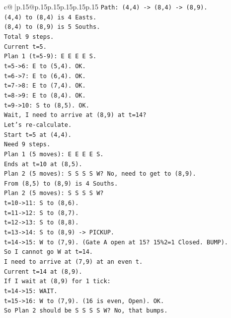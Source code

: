 \documentclass{article}
\begin{document}
{\begin{supertabular}{c@{$\;$}|p{.15\linewidth}@{}p{.15\linewidth}p{.15\linewidth}p{.15\linewidth}p{.15\linewidth}p{.15\linewidth}}
{{{\texttt{Path: (4,4) {-}> (8,4) {-}> (8,9).} \\
\texttt{(4,4) to (8,4) is 4 Easts.} \\
\texttt{(8,4) to (8,9) is 5 Souths.} \\
\texttt{Total 9 steps.} \\
\texttt{Current t=5.} \\
\texttt{Plan 1 (t=5{-}9): E E E E S.} \\
\texttt{t=5{-}>6: E to (5,4). OK.} \\
\texttt{t=6{-}>7: E to (6,4). OK.} \\
\texttt{t=7{-}>8: E to (7,4). OK.} \\
\texttt{t=8{-}>9: E to (8,4). OK.} \\
\texttt{t=9{-}>10: S to (8,5). OK.} \\
\texttt{Wait, I need to arrive at (8,9) at t=14?} \\
\texttt{Let's re{-}calculate.} \\
\texttt{Start t=5 at (4,4).} \\
\texttt{Need 9 steps.} \\
\texttt{Plan 1 (5 moves): E E E E S.} \\
\texttt{Ends at t=10 at (8,5).} \\
\texttt{Plan 2 (5 moves): S S S S W? No, need to get to (8,9).} \\
\texttt{From (8,5) to (8,9) is 4 Souths.} \\
\texttt{Plan 2 (5 moves): S S S S W?} \\
\texttt{t=10{-}>11: S to (8,6).} \\
\texttt{t=11{-}>12: S to (8,7).} \\
\texttt{t=12{-}>13: S to (8,8).} \\
\texttt{t=13{-}>14: S to (8,9) {-}> PICKUP.} \\
\texttt{t=14{-}>15: W to (7,9). (Gate A open at 15? 15\%2=1 Closed. BUMP).} \\
\texttt{So I cannot go W at t=14.} \\
\texttt{I need to arrive at (7,9) at an even t.} \\
\texttt{Current t=14 at (8,9).} \\
\texttt{If I wait at (8,9) for 1 tick:} \\
\texttt{t=14{-}>15: WAIT.} \\
\texttt{t=15{-}>16: W to (7,9). (16 is even, Open). OK.} \\
\texttt{So Plan 2 should be S S S S W? No, that bumps.} \\
}}}
\end{supertabular}}
\end{document}
